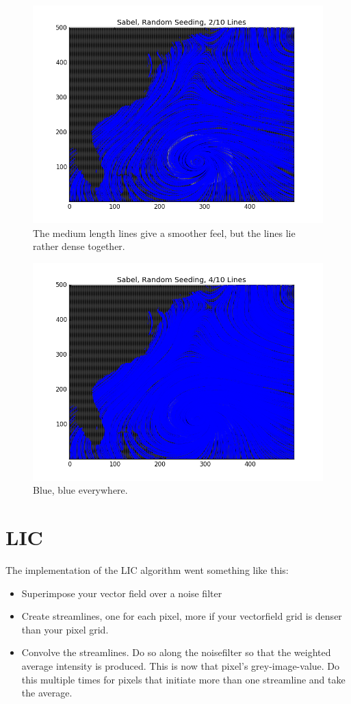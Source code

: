 \documentclass[a4paper,10pt]{report}
\begin{document}
\begin{figure}\centering
 \includegraphics[width=0.9\linewidth]{medium}
 \caption{The medium length lines give a smoother feel, but the lines lie rather dense together.}
 \label{fig4}
\end{figure}
\begin{figure}\centering
 \includegraphics[width=0.9\linewidth]{long}
 \caption{Blue, blue everywhere.}
 \label{fig5}
\end{figure}
\clearpage
\section*{LIC}
The implementation of the LIC algorithm went something like this:
\begin{itemize}
 \item Superimpose your vector field over a noise filter
 \item Create streamlines, one for each pixel, more if your vectorfield grid is denser than your pixel grid.
 \item Convolve the streamlines. Do so along the noisefilter so that the weighted average intensity is produced. This is now that pixel's grey-image-value. Do this multiple times for pixels that initiate more than one streamline and take the average. 
\end{itemize}
\end{document}
